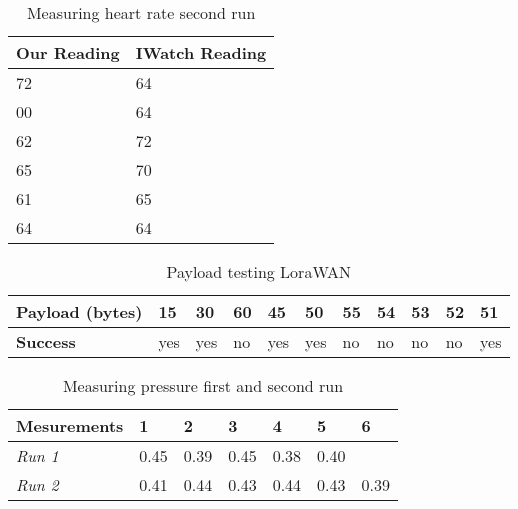 \begin{table}[h!]
	\centering
	\begin{tabular}{@{}ll@{}}
		\toprule
		\textbf{Our Reading} & \textbf{IWatch Reading} \\ \midrule
		72          & 64             \\
		00          & 64             \\
		62          & 72             \\
		65          & 70             \\
		61          & 65      		 \\      
		64          & 64			 \\ \bottomrule
	\end{tabular}
	\caption[Measuring heart rate second run]{Measuring heart rate second run}
	\label{tab:HeartRateSecond}
\end{table}

\begin{table}[h!]
	\centering
	\begin{tabular}{@{}lllllllllll@{}}
		\toprule
		\textbf{Payload (bytes)} & 15  & 30  & 60 & 45  & 50  & 55 & 54 & 53 & 52 & 51  \\ \midrule
		\textbf{Success} & yes & yes & no & yes & yes & no & no & no & no & yes \\ \bottomrule
	\end{tabular}
	\caption[Payload testing LoraWAN]{Payload testing LoraWAN}
	\label{tab:LoraWanPayload}
\end{table}


\begin{table}[h!]
	\centering
	\begin{tabular}{@{}lllllll@{}}
		\toprule
		\textbf{Mesurements} & \textbf{1} & \textbf{2} & \textbf{3} & \textbf{4} & \textbf{5} & \textbf{6} \\ \midrule
		\textit{Run 1} & 0.45 & 0.39 & 0.45 & 0.38 & 0.40 &  \\
		\textit{Run 2} & 0.41 & 0.44 & 0.43 & 0.44 & 0.43 & 0.39 \\ \bottomrule
	\end{tabular}
	\caption[Measuring pressure first and second run]{Measuring pressure first and second run}
	\label{tab:PressureData}
\end{table}



